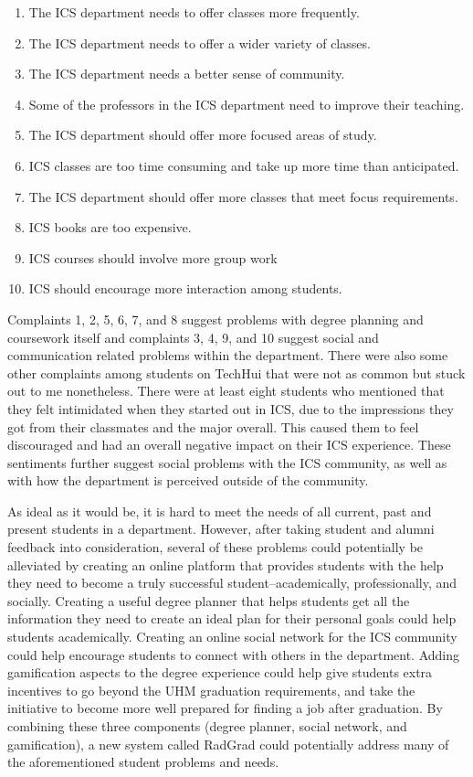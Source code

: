 \begin{enumerate}
  \item The ICS department needs to offer classes more frequently.
  \item The ICS department needs to offer a wider variety of classes.
  \item The ICS department needs a better sense of community.
  \item Some of the professors in the ICS department need to improve their teaching.
  \item The ICS department should offer more focused areas of study.
  \item ICS classes are too time consuming and take up more time than anticipated.
  \item The ICS department should offer more classes that meet focus requirements.
  \item ICS books are too expensive.
  \item ICS courses should involve more group work 
  \item ICS should encourage more interaction among students.
\end{enumerate}

Complaints 1, 2, 5, 6, 7, and 8 suggest problems with degree planning and coursework itself and complaints 3, 4, 9, and 10 suggest social and communication related problems within the department. There were also some other complaints among students on TechHui that were not as common but stuck out to me nonetheless. There were at least eight students who mentioned that they felt intimidated when they started out in ICS, due to the impressions they got from their classmates and the major overall. This caused them to feel discouraged and had an overall negative impact on their ICS experience. These sentiments further suggest social problems with the ICS community, as well as with how the department is perceived outside of the community. 

As ideal as it would be, it is hard to meet the needs of all current, past and present students in a department. However, after taking student and alumni feedback into consideration, several of these problems could potentially be alleviated by creating an online platform that provides students with the help they need to become a truly successful student--academically, professionally, and socially. Creating a useful degree planner that helps students get all the information they need to create an ideal plan for their personal goals could help students academically. Creating an online social network for the ICS community could help encourage students to connect with others in the department. Adding gamification aspects to the degree experience could help give students extra incentives to go beyond the UHM graduation requirements, and take the initiative to become more well prepared for finding a job after graduation. By combining these three components (degree planner, social network, and gamification), a new system called RadGrad could potentially address many of the aforementioned student problems and needs.  

